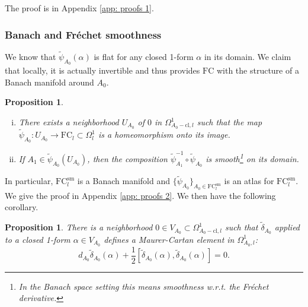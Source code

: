 \documentclass[11pt,a4paper]{amsart}
\theoremstyle{plain} %
\newtheorem{prop}[thm]{Proposition}
\theoremstyle{definition}
\theoremstyle{remark}
\newcommand{\g}{\mathfrak{g}}
\newcommand{\Sym}{\operatorname{Sym}}
\newcommand{\mr}{\mathrm}
\newcommand{\ra}{\rightarrow}
\newcommand{\til}{\widetilde}
\newcommand{\FC}{\mathrm{FC}}
\begin{document}
The proof is in Appendix \ref{app: proofs 1}.
\subsubsection{Banach and Fr\'echet smoothness}
We know that $\til{\psi}_{A_0}(\alpha)$ is flat for any closed 1-form $\alpha$ in its domain. We claim that locally, it is actually invertible and thus provides $\FC$ with the structure of a Banach manifold around $A_0$.
\begin{prop}\label{prop: bij}
   \begin{enumerate}[i)]
   \item There exists a neighborhood $U_{A_0}$ of $0$ in $\Omega^1_{A_0-\mr{cl},l}$ such that the map $\til{\psi}_{A_0}\colon U_{A_0} \to \FC_l\subset \Omega^1_l$ is a homeomorphism onto its image.  
   \item If $A_1 \in \til{\psi}_{A_0}(U_{A_0})$, then the composition $\til\psi_{A_1}^{-1} \circ \til\psi_{A_0}$ is smooth\footnote{In the Banach space setting this means smoothness w.r.t. the Fr\'echet derivative.} on its domain. 
   \end{enumerate} 
\end{prop}
In particular, $\FC^\mr{sm}_l$ is a Banach manifold and $\{\til\psi_{A_0}\}_{A_0 \in \FC^\mr{sm}_l}$ is an atlas for $\FC^\mr{sm}_l$. We give the proof in Appendix \ref{app: proofs 2}. We then have the following corollary. 
    \begin{prop}\label{prop: til delta MC}
    There is a neighborhood $0 \in V_{A_0} \subset \Omega^1_{A_0-\mr{cl},l}$ such that $\til{\delta}_{A_0}$ 
    applied to a closed 1-form $\alpha \in V_{A_0}$
    defines a Maurer-Cartan element in $\Omega^1_{A_0,l}$: 
    \begin{equation} 
    d_{A_0}\til{\delta}_{A_0} (\alpha) + \frac{1}{2}[\til{\delta}_{A_0}(\alpha),\til{\delta}_{A_0} (\alpha)] = 0.\label{eq: MC delta tilde}
    \end{equation}
    \end{prop}
\end{document}

